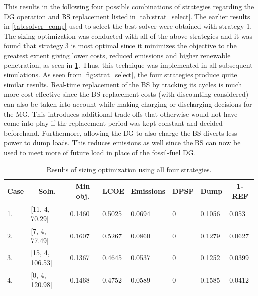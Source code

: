 \documentclass[final,3p,times]{elsarticle}
\begin{document}
This results in the following four possible combinations of strategies regarding the DG operation and BS replacement listed in \cref{tab:strat_select}. The earlier results in \cref{tab:solver_comp} used to select the best solver were obtained with strategy 1. The sizing optimization was conducted with all of the above strategies and it was found that strategy 3 is most optimal since it minimizes the objective to the greatest extent giving lower costs, reduced emissions and higher renewable penetration, as seen in \cref{tab:strat}. Thus, this technique was implemented in all subsequent simulations. As seen from \cref{fig:strat_select}, the four strategies produce quite similar results. Real-time replacement of the BS by tracking its cycles is much more cost effective since the BS replacement costs (with discounting considered) can also be taken into account while making charging or discharging decisions for the MG. This introduces additional trade-offs that otherwise would not have come into play if the replacement period was kept constant and decided beforehand. Furthermore, allowing the DG to also charge the BS diverts less power to dump loads. This reduces emissions as well since the BS can now be used to meet more of future load in place of the fossil-fuel DG.

\begin{table}[htbp]
\centering
\begin{tabular}{p{0.2cm} p{3.2cm} p{0.2cm} p{0.25cm} p{0.2cm} p{0.2cm} p{0.2cm} p{0.2cm}}
\toprule
\multicolumn{1}{c}{\textbf{Case}}   & \multicolumn{1}{c}{\textbf{Soln.}}               & \multicolumn{1}{c}{\textbf{Min obj.}} & \multicolumn{1}{c}{\textbf{LCOE}} & \multicolumn{1}{c}{\textbf{Emissions}} & \multicolumn{1}{c}{\textbf{DPSP}} & \multicolumn{1}{c}{\textbf{Dump}} & \multicolumn{1}{c}{\textbf{1-REF}} \\ 
\midrule
1.            & [11, 4, 70.29] & 0.1460            & 0.5025                   & 0.0694                        & 0             & 0.1056        & 0.053          \\
2.         & [7,    4,   77.49]  & 0.1607            & 0.5267                   & 0.0860                        & 0             & 0.1279        & 0.0627         \\
3.     & [15,   4,  106.53] & 0.1367            & 0.4645                   & 0.0537                        & 0             & 0.1252        & 0.0399         \\
4.  & [0,    4,  120.98]       & 0.1468            & 0.4752                   & 0.0589                        & 0             & 0.1585        & 0.0412         \\ 
\bottomrule
\end{tabular}
\caption{\label{tab:strat} Results of sizing optimization using all four strategies.}
\end{table}
\end{document}
